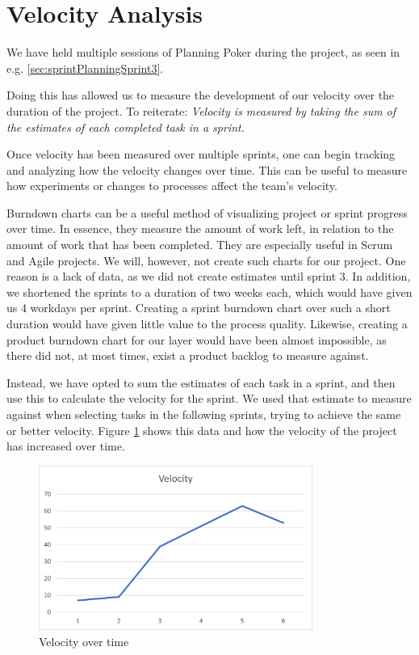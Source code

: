 \section{Velocity Analysis}\label{sec:velocityAnalysis}
We have held multiple sessions of Planning Poker during the project, as seen in e.g. \ref{sec:sprintPlanningSprint3}.

Doing this has allowed us to measure the development of our velocity over the duration of the project.
To reiterate: \textit{Velocity is measured by taking the sum of the estimates of each completed task in a sprint\cite{sutherlandScrumArtDoing2014}.}

Once velocity has been measured over multiple sprints, one can begin tracking and analyzing how the velocity changes over time. This can be useful to measure how experiments or changes to processes affect the team's velocity.

Burndown charts can be a useful method of visualizing project or sprint progress over time. In essence, they measure the amount of work left, in relation to the amount of work that has been completed. They are especially useful in Scrum and Agile projects\cite{HowCreateBurndown2021}. We will, however, not create such charts for our project. One reason is a lack of data, as we did not create estimates until sprint 3.
In addition, we shortened the sprints to a duration of two weeks each, which would have given us 4 workdays per sprint. Creating a sprint burndown chart over such a short duration would have given little value to the process quality.
Likewise, creating a product burndown chart for our layer would have been almost impossible, as there did not, at most times, exist a product backlog to measure against.

Instead, we have opted to sum the estimates of each task in a sprint, and then use this to calculate the velocity for the sprint. We used that estimate to measure against when selecting tasks in the following sprints, trying to achieve the same or better velocity. Figure \ref{img:velocityOverTime} shows this data and how the velocity of the project has increased over time.

\begin{figure}[h!]
\centering
\includegraphics[width=0.8\textwidth]{Images/VelocityAnalysis.png}
\caption{Velocity over time}
\label{img:velocityOverTime}
\end{figure}


